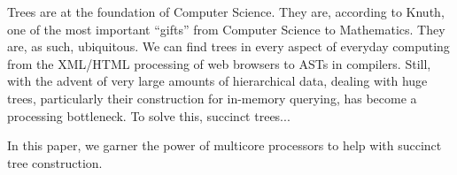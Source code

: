 Trees are at the foundation of Computer Science. They are, according
to Knuth, one of the most important ``gifts'' from Computer Science to
Mathematics. They are, as such, ubiquitous. We can find trees in every
aspect of everyday computing from the XML/HTML processing of web
browsers to ASTs in compilers. Still, with the advent of very large
amounts of hierarchical data, dealing with huge trees, particularly
their construction for in-memory querying, has become a processing
bottleneck. To solve this, succinct trees...

In this paper, we garner the power of multicore processors to help
with succinct tree construction.
